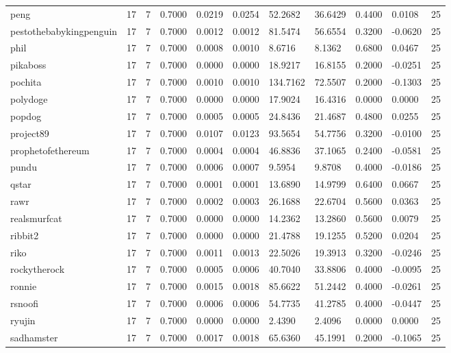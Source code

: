\begin{table}[htbp]
\begin{tabular}{lllllllllll}
peng & 17 & 7 & 0.7000 & 0.0219 & 0.0254 & 52.2682 & 36.6429 & 0.4400 & 0.0108 & 25 \\
pestothebabykingpenguin & 17 & 7 & 0.7000 & 0.0012 & 0.0012 & 81.5474 & 56.6554 & 0.3200 & -0.0620 & 25 \\
phil & 17 & 7 & 0.7000 & 0.0008 & 0.0010 & 8.6716 & 8.1362 & 0.6800 & 0.0467 & 25 \\
pikaboss & 17 & 7 & 0.7000 & 0.0000 & 0.0000 & 18.9217 & 16.8155 & 0.2000 & -0.0251 & 25 \\
pochita & 17 & 7 & 0.7000 & 0.0010 & 0.0010 & 134.7162 & 72.5507 & 0.2000 & -0.1303 & 25 \\
polydoge & 17 & 7 & 0.7000 & 0.0000 & 0.0000 & 17.9024 & 16.4316 & 0.0000 & 0.0000 & 25 \\
popdog & 17 & 7 & 0.7000 & 0.0005 & 0.0005 & 24.8436 & 21.4687 & 0.4800 & 0.0255 & 25 \\
project89 & 17 & 7 & 0.7000 & 0.0107 & 0.0123 & 93.5654 & 54.7756 & 0.3200 & -0.0100 & 25 \\
prophetofethereum & 17 & 7 & 0.7000 & 0.0004 & 0.0004 & 46.8836 & 37.1065 & 0.2400 & -0.0581 & 25 \\
pundu & 17 & 7 & 0.7000 & 0.0006 & 0.0007 & 9.5954 & 9.8708 & 0.4000 & -0.0186 & 25 \\
qstar & 17 & 7 & 0.7000 & 0.0001 & 0.0001 & 13.6890 & 14.9799 & 0.6400 & 0.0667 & 25 \\
rawr & 17 & 7 & 0.7000 & 0.0002 & 0.0003 & 26.1688 & 22.6704 & 0.5600 & 0.0363 & 25 \\
realsmurfcat & 17 & 7 & 0.7000 & 0.0000 & 0.0000 & 14.2362 & 13.2860 & 0.5600 & 0.0079 & 25 \\
ribbit2 & 17 & 7 & 0.7000 & 0.0000 & 0.0000 & 21.4788 & 19.1255 & 0.5200 & 0.0204 & 25 \\
riko & 17 & 7 & 0.7000 & 0.0011 & 0.0013 & 22.5026 & 19.3913 & 0.3200 & -0.0246 & 25 \\
rockytherock & 17 & 7 & 0.7000 & 0.0005 & 0.0006 & 40.7040 & 33.8806 & 0.4000 & -0.0095 & 25 \\
ronnie & 17 & 7 & 0.7000 & 0.0015 & 0.0018 & 85.6622 & 51.2442 & 0.4000 & -0.0261 & 25 \\
rsnoofi & 17 & 7 & 0.7000 & 0.0006 & 0.0006 & 54.7735 & 41.2785 & 0.4000 & -0.0447 & 25 \\
ryujin & 17 & 7 & 0.7000 & 0.0000 & 0.0000 & 2.4390 & 2.4096 & 0.0000 & 0.0000 & 25 \\
sadhamster & 17 & 7 & 0.7000 & 0.0017 & 0.0018 & 65.6360 & 45.1991 & 0.2000 & -0.1065 & 25 \\

\end{tabular}
\end{table}
